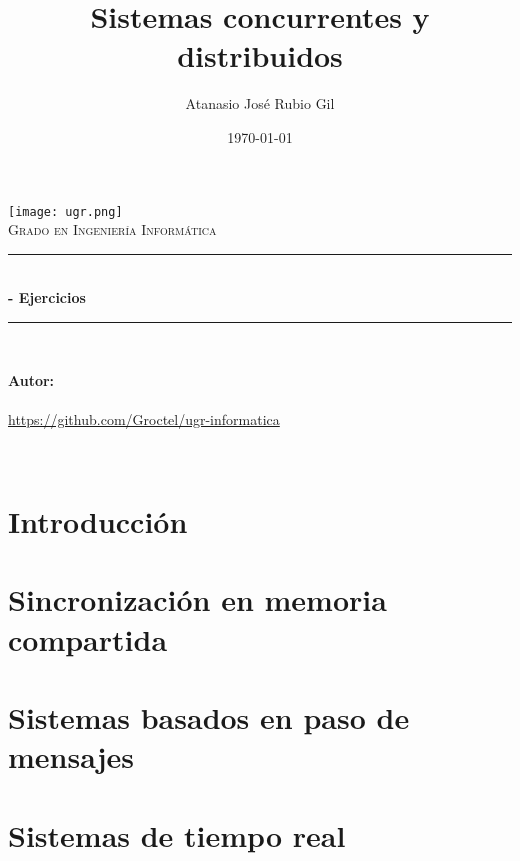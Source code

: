 \documentclass[10pt, spanish]{report}
\title{%
	Sistemas concurrentes y distribuidos
}
\author{%
	Atanasio José Rubio Gil
}
\date{%
	\today
}
\makeatletter
\let\thetitle\@title
\let\theauthor\@author
\let\thedate\@date
\makeatother
\begin{document}
\begin{titlepage}
	\centering
	\texttt{[image: ugr.png]}\\
	\textsc{\Huge Grado en Ingeniería Informática}\\[0.5 cm]
	\rule{\linewidth}{0.2 mm}\\[0.2 cm]
	{\huge\bfseries\thetitle- Ejercicios}\\
		\rule{\linewidth}{0.2 mm}\\[1 cm]

	\begin{center} \large
		\textbf{Autor:}\\
		\theauthor\\
		{\url{https://github.com/Groctel/ugr-informatica}}\\[1 cm]
	\end{center}

	{\large \thedate}\\[1.5 cm]
	{\doclicenseThis}
	\vfill
\end{titlepage}

\chapter{Introducción}

\chapter{Sincronización en memoria compartida}

\chapter{Sistemas basados en paso de mensajes}


\chapter{Sistemas de tiempo real}

\end{document}
